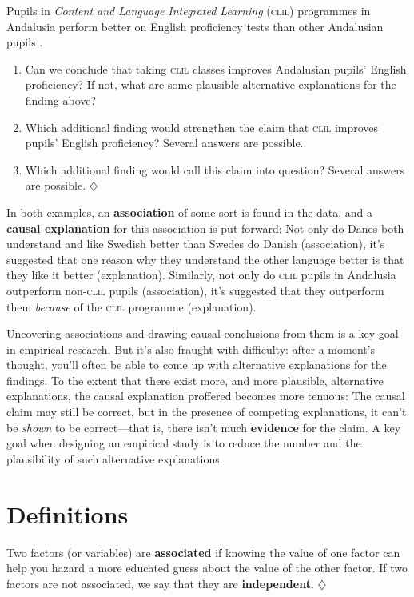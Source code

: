 \documentclass[a4paper]{tufte-book}\usepackage[]{graphicx}\usepackage[]{xcolor}
\newcommand{\term}[1]{\textbf{#1}}
\newcommand*{\parend}[1][$\diamondsuit$]{%
  \unskip\nobreak\hspace{1em plus 1fill}$\diamondsuit$%
}
\begin{document}
\label{ex:clil}
Pupils in \textit{Content and Language Integrated Learning} (\textsc{clil}) programmes 
in Andalusia perform better on English proficiency tests 
than other Andalusian pupils \citep{Lorenzo2010}.

\begin{enumerate}
\item Can we conclude that taking \textsc{clil} classes improves 
      Andalusian pupils' English proficiency?
      If not, what are some plausible alternative explanations for the finding
      above?

\item Which additional finding would strengthen the claim that 
      \textsc{clil} improves pupils' English proficiency?
      Several answers are possible.
\item Which additional finding would call this claim into question?
      Several answers are possible.\parend
\end{enumerate}

In both examples, an \term{association} of some sort is found in the data,
and a \term{causal explanation} for this association is put forward: 
Not only do Danes both understand and like Swedish better than Swedes do Danish 
(association), it's suggested that one reason why they understand the other 
language better is that they like it better (explanation).
Similarly, not only do \textsc{clil} pupils in Andalusia outperform 
non-\textsc{clil} pupils (association),
it's suggested that they outperform them 
\emph{because} of the \textsc{clil} programme (explanation).

Uncovering associations and drawing causal conclusions from them is a key
goal in empirical research. But it's also fraught with difficulty: after a
moment's thought, you'll often be able to come up with alternative explanations
for the findings. To the extent that there exist more, and more plausible,
alternative explanations, the causal explanation proffered becomes more tenuous:
The causal claim may still be correct, but in the presence of competing explanations,
it can't be \emph{shown} to be correct---that is, there isn't much \term{evidence}
for the claim.
A key goal when designing an empirical study is to reduce the number and the
plausibility of such alternative explanations.

\section{Definitions}
\label{def:association}
Two factors (or variables) 
are \term{associated} if knowing the value of one factor
can help you hazard a more educated guess about the value of the other factor.
If two factors are not associated, we say that they are \term{independent}.
\parend
\end{document}
